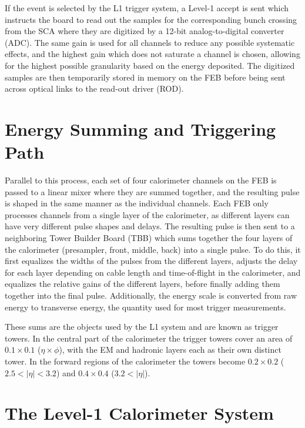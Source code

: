 If the event is selected by the L1 trigger system, a Level-1 accept is sent which instructs the board to read out the samples for the corresponding bunch crossing from the SCA where they are digitized by a 12-bit analog-to-digital converter (ADC).  The same gain is used for all channels to reduce any possible systematic effects, and the highest gain which does not saturate a channel is chosen, allowing for the highest possible granularity based on the energy deposited.  The digitized samples are then temporarily stored in memory on the FEB before being sent across optical links to the read-out driver (ROD).


\section{Energy Summing and Triggering Path}
\label{sec:TriggerPath}

Parallel to this process, each set of four calorimeter channels on the FEB is passed to a linear mixer where they are summed together, and the resulting pulse is shaped in the same manner as the individual channels.  Each FEB only processes channels from a single layer of the calorimeter, as different layers can have very different pulse shapes and delays.  The resulting pulse is then sent to a neighboring Tower Builder Board (TBB) which sums together the four layers of the calorimeter (presampler, front, middle, back) into a single pulse.  To do this, it first equalizes the widths of the pulses from the different layers, adjusts the delay for each layer depending on cable length and time-of-flight in the calorimeter, and equalizes the relative gains of the different layers, before finally adding them together into the final pulse.  Additionally, the energy scale is converted from raw energy to transverse energy, the quantity used for most trigger measurements.

These sums are the objects used by the L1 system and are known as trigger towers.  In the central part of the calorimeter the trigger towers cover an area of $0.1\times0.1$ ($\eta\times\phi$), with the EM and hadronic layers each as their own distinct tower.   In the forward regions of the calorimeter the towers become $0.2\times0.2$ ($2.5<|\eta|<3.2$) and $0.4\times0.4$ ($3.2<|\eta|$).

\section{The Level-1 Calorimeter System}

